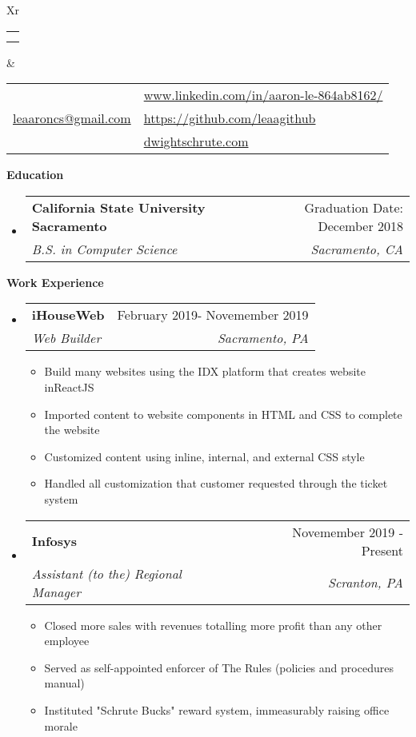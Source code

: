 \documentclass[letterpaper,12pt]{article}[leftmargin=*]
\makeatletter
\def \fullname {Aaron Le}
\def \subtitle {}
\def \linkedinicon {\faLinkedin}
\def \linkedinlink {https://www.linkedin.com/in/aaron-le-864ab8162/}
\def \linkedintext {www.linkedin.com/in/aaron-le-864ab8162/}
\def \phoneicon {\faPhone}
\def \phonetext {+1-916-833-6959}
\def \emailicon {\faEnvelope}
\def \emaillink {mailto:leaaroncs@gmail.com}
\def \emailtext {leaaroncs@gmail.com}
\def \githubicon {\faGithub}
\def \githublink {https://github.com/leaagithub}
\def \githubtext {https://github.com/leaagithub}
\def \websiteicon {\faGlobe}
\def \websitelink {https://google.com/}
\def \websitetext {dwightschrute.com}
\def \headertype {\doublecol} %
\def \entryspacing {-0pt}
\def \linkedin {\linkedinicon \hspace{3pt}\href{\linkedinlink}{\linkedintext}}
\def \phone {\phoneicon \hspace{3pt}{ \phonetext}}
\def \email {\emailicon \hspace{3pt}\href{\emaillink}{\emailtext}}
\def \github {\githubicon \hspace{3pt}\href{\githublink}{\githubtext}}
\def \website {\websiteicon \hspace{3pt}\href{\websitelink}{\websitetext}}
\renewcommand{\section}[2]{\vspace{5pt}
  \colorbox{secondary}{\color{white}\raggedbottom\normalsize\textbf{{#1}{\hspace{7pt}#2}}}
}
\newcommand{\resumeEntryStart}{\begin{itemize}[leftmargin=2.5mm]}
\newcommand{\resumeEntryEnd}{\end{itemize}\vspace{\entryspacing}}
\newcommand{\resumeItemListStart}{\begin{itemize}[leftmargin=4.5mm]}
\newcommand{\resumeItemListEnd}{\end{itemize}}
\newcommand{\resumeItem}[1]{
  \item\small{
    {#1 \vspace{-2pt}}
  }
}
\newcommand{\resumeEntryTSDL}[4]{
  \vspace{-1pt}\item[]
    \begin{tabularx}{0.97\textwidth}{X@{\hspace{60pt}}r}
      \textbf{\color{primary}#1} & {\firabook\color{accent}\small#2} \\
      \textit{\color{accent}\small#3} & \textit{\color{accent}\small#4} \\
    \end{tabularx}\vspace{-6pt}
}
\newcommand{\doublecol}[6]{
  \begin{tabularx}{\textwidth}{Xr}
    {
      \begin{tabular}[c]{l}
        \fontsize{35}{45}\selectfont{\color{primary}{{\textbf{\fullname}}}} \\
        {\textit{\subtitle}} %
      \end{tabular}
    } & {
      \begin{tabular}[c]{l@{\hspace{1.5em}}l}
        {\small#4} & {\small#1} \\
        {\small#5} & {\small#2} \\
        {\small#6} & {\small#3}
      \end{tabular}
    }
  \end{tabularx}
}
\newcommand{\singlecol}[6]{
  \begin{tabularx}{\textwidth}{Xr}
    {
      \begin{tabular}[b]{l}
        \fontsize{35}{45}\selectfont{\color{primary}{{\textbf{\fullname}}}} \\
        {\textit{\subtitle}} %
      \end{tabular}
    } & {
      \begin{tabular}[c]{l}
        {\small#1} \\
        {\small#2} \\
        {\small#3} \\
        {\small#4} \\
        {\small#5} \\
        {\small#6}
      \end{tabular}
    }
  \end{tabularx}
}
\makeatother
\begin{document}


\headertype{\linkedin}{\github}{\website}{\phone}{\email}{} %
\vspace{-10pt} %

\section{\faGraduationCap}{Education}

  \resumeEntryStart
    \resumeEntryTSDL
      {California State University Sacramento}{Graduation Date: December 2018}
      {B.S. in Computer Science}{Sacramento, CA}
  \resumeEntryEnd

\section{\faPieChart}{Work Experience}

  \resumeEntryStart
    \resumeEntryTSDL
      {iHouseWeb}{February 2019- Novemember 2019}
      {Web Builder}{Sacramento, PA}
    \resumeItemListStart
      \resumeItem {Build many websites using the IDX platform that creates website inReactJS}
      \resumeItem {Imported content to website components in HTML and CSS to complete the website}
      \resumeItem {Customized content using inline, internal, and external CSS style}
      \resumeItem {Handled all customization that customer requested through the ticket system}
    \resumeItemListEnd
  \resumeEntryEnd

  \resumeEntryStart
    \resumeEntryTSDL
      {Infosys }{Novemember 2019 - Present}
      {Assistant (to the) Regional Manager}{Scranton, PA}
    \resumeItemListStart
      \resumeItem {Closed more sales with revenues totalling more profit than any other employee}
      \resumeItem {Served as self-appointed enforcer of The Rules (policies and procedures manual)}
      \resumeItem {Instituted "Schrute Bucks" reward system, immeasurably raising office morale}
    \resumeItemListEnd
  \resumeEntryEnd
\end{document}

